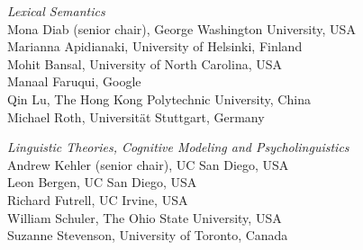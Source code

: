 \emph{Lexical Semantics} \\
\hspace*{0.2in}Mona Diab (senior chair), George Washington University, USA \\ 
\hspace*{0.2in}Marianna Apidianaki, University of Helsinki, Finland \\
\hspace*{0.2in}Mohit Bansal, University of North Carolina, USA \\
\hspace*{0.2in}Manaal Faruqui, Google \\
\hspace*{0.2in}Qin Lu, The Hong Kong Polytechnic University, China \\
\hspace*{0.2in}Michael Roth, Universität Stuttgart, Germany 

\clearpage

\emph{Linguistic Theories, Cognitive Modeling and Psycholinguistics} \\
\hspace*{0.2in}Andrew Kehler (senior chair), UC San Diego, USA \\ 
\hspace*{0.2in}Leon Bergen, UC San Diego, USA \\
\hspace*{0.2in}Richard Futrell, UC Irvine, USA \\
\hspace*{0.2in}William Schuler, The Ohio State University, USA \\
\hspace*{0.2in}Suzanne Stevenson, University of Toronto, Canada


